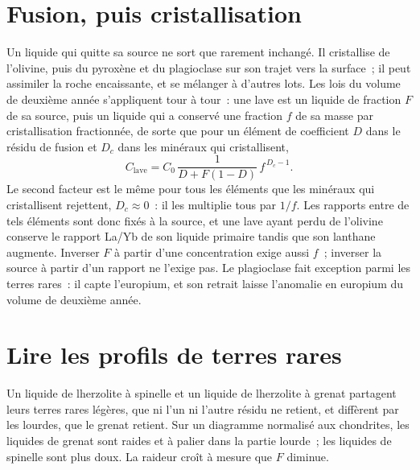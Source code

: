\section{Fusion, puis cristallisation}\label{sec:b3:trace-element-modelling:crystallisation}

Un liquide qui quitte sa source ne sort que rarement inchangé. Il cristallise
de l'olivine, puis du pyroxène et du plagioclase sur son trajet vers la surface~;
il peut assimiler la roche encaissante, et se mélanger à d'autres lots. Les lois du volume de deuxième année s'appliquent
tour à tour~: une lave est un liquide de fraction $F$ de sa source, puis un liquide qui
a conservé une fraction $f$ de sa masse par cristallisation fractionnée, de sorte que
pour un élément de coefficient $D$ dans le résidu de fusion et $D_c$ dans les
minéraux qui cristallisent,
\[
C_{\text{lave}} = C_0\,\frac{1}{D + F(1 - D)}\,f^{\,D_c - 1}.
\]
Le second facteur est le même pour tous les éléments que les minéraux qui cristallisent
rejettent, $D_c \approx 0$~: il les multiplie tous par $1/f$. Les rapports entre de tels
éléments sont donc fixés à la source, et une lave ayant perdu de l'olivine conserve le
rapport La/Yb de son liquide primaire tandis que son lanthane augmente. Inverser $F$
à partir d'une concentration exige aussi $f$~; inverser la source à partir d'un rapport
ne l'exige pas. Le plagioclase fait exception parmi les terres rares~: il capte
l'europium, et son retrait laisse l'anomalie en europium du volume de deuxième année.

\section{Lire les profils de terres rares}\label{sec:b3:trace-element-modelling:patterns}

Un liquide de lherzolite à spinelle et un liquide de lherzolite à grenat partagent
leurs terres rares légères, que ni l'un ni l'autre résidu ne retient, et diffèrent
par les lourdes, que le grenat retient. Sur un diagramme normalisé aux chondrites,
les liquides de grenat sont raides et à palier dans la partie lourde~; les liquides de spinelle sont plus doux. La
raideur croît à mesure que $F$ diminue.

